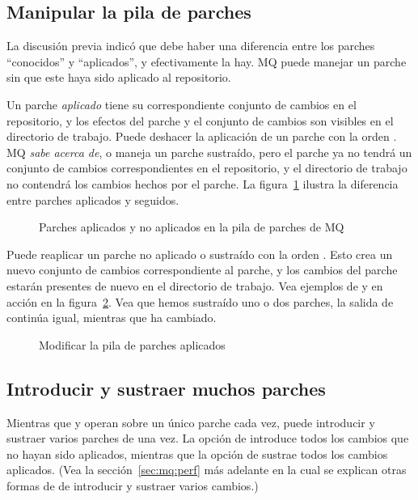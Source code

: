 \subsection{Manipular la pila de parches}

La discusión previa indicó que debe haber una diferencia entre los
parches ``conocidos'' y ``aplicados'', y efectivamente la hay.  MQ
puede manejar un parche sin que este haya sido aplicado al
repositorio.

Un parche \emph{aplicado} tiene su correspondiente conjunto de cambios
en el repositorio, y los efectos del parche y el conjunto de cambios
son visibles en el directorio de trabajo.  Puede deshacer la
aplicación de un parche con la orden .  MQ 
\emph{sabe acerca de}, o maneja un parche sustraído, pero el parche ya
no tendrá un conjunto de cambios correspondientes en el repositorio, y
el directorio de trabajo no contendrá los cambios hechos por el
parche.  La figura~\ref{fig:mq:stack} ilustra la diferencia entre
parches aplicados y seguidos.

\begin{figure}[ht]
  \centering
  \caption{Parches aplicados y no aplicados en la pila de parches de MQ}
  \label{fig:mq:stack}
\end{figure}

Puede reaplicar un parche no aplicado o sustraído con la orden
.  Esto crea un nuevo conjunto de cambios
correspondiente al parche, y los cambios del parche estarán presentes
de nuevo en el directorio de trabajo.  Vea ejemplos de
 y  en acción en la
figura~\ref{ex:mq:qpop}.  Vea que hemos sustraído uno o dos parches,
la salida de continúa igual, mientras que
 ha  cambiado.

\begin{figure}[ht]
  \caption{Modificar la pila de parches aplicados}
  \label{ex:mq:qpop}
\end{figure}

\subsection{Introducir y sustraer muchos parches}

Mientras que  y  operan sobre un
único parche cada vez, puede introducir y sustraer varios parches de
una vez.  La opción  de 
introduce todos los cambios que no hayan sido aplicados, mientras que
la opción  de  sustrae todos los
cambios aplicados.  (Vea la sección~\ref{sec:mq:perf} más adelante
en la cual se explican otras formas de de introducir y sustraer varios
cambios.)

